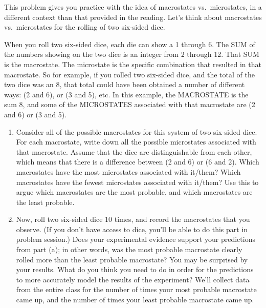 \begin{exercise} 
  This problem gives you practice with the idea of macrostates vs.\
  microstates, in a different context than that provided in the
  reading.  Let's think about macrostates vs.\ microstates for the
  rolling of two six-sided dice. 
 
  When you roll two six-sided dice, each die can show a 1 through 6.
  The SUM of the numbers showing on the two dice is an integer from 2
  through 12.  That SUM is the macrostate.  The microstate is the
  specific combination that resulted in that macrostate.  So for
  example, if you rolled two six-sided dice, and the total of the two
  dice was an 8, that total could have been obtained a number of
  different ways: (2 and 6), or (3 and 5), etc.  In this example, the
  MACROSTATE is the sum 8, and some of the MICROSTATES associated with
  that macrostate are (2 and 6) or (3 and 5).

  \begin{enumerate}
  \item Consider all of the possible macrostates for this system of
    two six-sided dice.  For each macrostate, write down all the
    possible microstates associated with that macrostate.  Assume that
    the dice are distinguishable from each other, which means that
    there is a difference between (2 and 6) or (6 and 2).  Which
    macrostates have the most microstates associated with it/them?
    Which macrostates have the fewest microstates associated with
    it/them?  Use this to argue which macrostates are the most
    probable, and which macrostates are the least probable.

  \item Now, roll two six-sided dice 10 times, and record the
    macrostates that you observe. (If you don't have access to dice,
    you'll be able to do this part in problem session.)  Does your
    experimental evidence support your predictions from part (a); in
    other words, was the most probable macrostate clearly rolled more
    than the least probable macrostate?  You may be surprised by your
    results.  What do you think you need to do in order for the
    predictions to more accurately model the results of the
    experiment?  We'll collect data from the entire class for the
    number of times your most probable macrostate came up, and the
    number of times your least probable macrostate came up.

  \end{enumerate}
\end{exercise}




